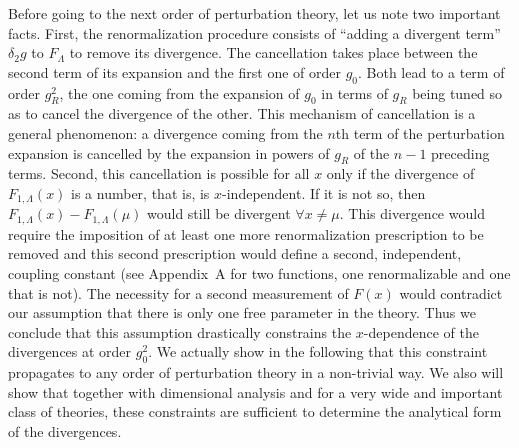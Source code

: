 \documentclass[floatfix,preprintnumbers,amsmath,amssymb,prb,12pt]{revtex4-1}
\begin{document}
Before going to the next order of perturbation theory, let us note
two important facts. First, the renormalization procedure consists
of ``adding a divergent term'' $\delta_2 g$ to $F_\Lambda$ to
remove its divergence. The cancellation takes place between the
second term of its expansion and the first one of order $g_0$.
Both lead to a term of order $g_R^2$, the one coming from the
expansion of $g_0$ in terms of $g_R$ being tuned so as to cancel
the divergence of the other. This mechanism of cancellation is a
general phenomenon: a divergence coming from the
$n$th term of the perturbation expansion is cancelled by the
expansion in powers of $g_R$ of the
$n-1$ preceding terms. Second, this cancellation is 
possible for all $x$ only if the divergence of
$F_{1,\Lambda}(x)$ is a number, that is, is
$x$-independent. If it is not so, then $F_{1,\Lambda}(x) -
F_{1,\Lambda}(\mu)$ would still be divergent $\forall x\ne\mu$.
This divergence would require the imposition of at least one
more renormalization prescription to be removed
and this second prescription would define a second, independent,
coupling constant (see Appendix~A for two functions, one 
renormalizable and one that is not). The necessity for a second
measurement of $F(x)$ would 
contradict our assumption that there is only one free parameter in
the theory. Thus we conclude that this assumption drastically
constrains the $x$-dependence of the divergences at order $g_0^2$.
We actually show in the following that this constraint propagates
to any order of perturbation theory in a non-trivial way. We also
will show that together with dimensional analysis and for a very
wide and important class of theories, these constraints are
sufficient to determine the analytical form of the divergences.
\end{document}
